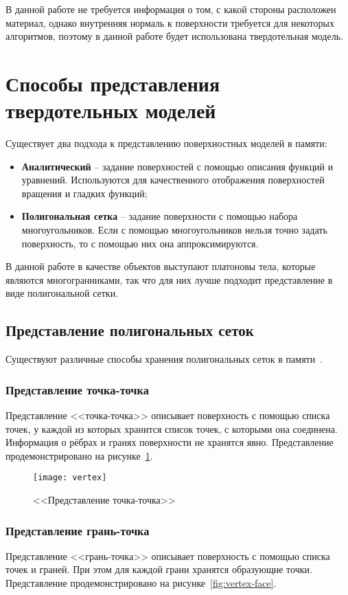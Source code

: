 В данной работе не требуется информация о том, с какой стороны расположен материал, однако внутренняя нормаль к поверхности требуется для некоторых алгоритмов, поэтому в данной работе будет использована твердотельная модель.

\section{Способы представления твердотельных моделей}
Существует два подхода к представлению поверхностных моделей в памяти:
\begin{itemize}
	\item \textbf{Аналитический} -- задание поверхностей с помощью описания функций и уравнений. Используются для качественного отображения поверхностей вращения и гладких функций;
	\item \textbf{Полигональная сетка} -- задание поверхности с помощью набора многоугольников. Если с помощью многоугольников нельзя точно задать поверхность, то с помощью них она аппроксимируются.
\end{itemize}

В данной работе в качестве объектов выступают платоновы тела, которые являются многогранниками, так что для них лучше подходит представление в виде полигональной сетки.

\subsection*{Представление полигональных сеток}
Существуют различные способы хранения полигональных сеток в памяти~\cite{colins}.

\subsubsection{Представление точка-точка}
Представление <<точка-точка>> описывает поверхность с помощью списка точек, у каждой из которых хранится список точек, с которыми она соединена. Информация о рёбрах и гранях поверхности не хранятся явно. Представление продемонстрировано на рисунке~\ref{fig:vertex-vertex}.


\begin{figure}[H]
	\centering
	\texttt{[image: vertex]}
	\caption{<<Представление точка-точка>>}
	\label{fig:vertex-vertex}
\end{figure}


\subsubsection{Представление грань-точка}
Представление <<грань-точка>> описывает поверхность с помощью списка точек и граней. При этом для каждой грани хранятся образующие точки. Представление продемонстрировано на рисунке~\ref{fig:vertex-face}.

